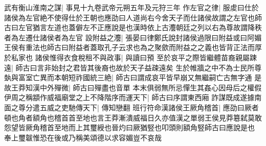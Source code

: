 武有衡山淮南之謀|{
	事見十九卷武帝元朔五年及元狩三年}
作左官之律|{
	服䖍曰仕於諸侯為左官絶不使得仕於王朝也應劭曰人道尚右今舍天子而仕諸侯故謂之左官也師古曰左官猶言左道也蓋僻左不正應說是也漢時依上古灋朝廷之列以右為尊故謂降秩者為左遷仕諸侯者為左官}
設附益之灋|{
	張晏曰律鄭氏說封諸侯過限曰附益或曰阿媚王侯有重法也師古曰附益者蓋取孔子云求也為之聚歛而附益之之義也皆背正法而厚於私家也}
諸侯惟得衣食稅租不與政事|{
	與讀曰預}
至於哀平之際皆繼體苗裔親屬踈遠|{
	師古曰言非始封之君皆其後裔也故於天子益疎遠矣}
生於帷牆之中不為士民所尊埶與富室亡異而本朝短祚國統三絶|{
	師古曰謂成哀平皆早崩又無繼嗣亡古無字通}
是故王莽知漢中外殫微|{
	師古曰殫盡也音單}
本末俱弱無所忌憚生其姦心因母后之權假伊周之稱顓作威福廟堂之上不降階序而運天下|{
	師古曰序謂東西廂}
詐謀既成遂據南面之尊分遣五威之吏馳傳天下|{
	傳知戀翻}
班行符命漢諸侯王厥角稽首|{
	應劭曰厥者頓也角者額角也稽首首至地也言王莽漸潰威福日久亦值漢之單弱王侯見莽簒弑莫敢怨望皆厥角稽首至地而上其璽綬也晉灼曰厥猶竪也叩頭則額角竪師古曰應說是也}
奉上璽韍惟恐在後或乃稱美頌德以求容媚豈不哀哉

